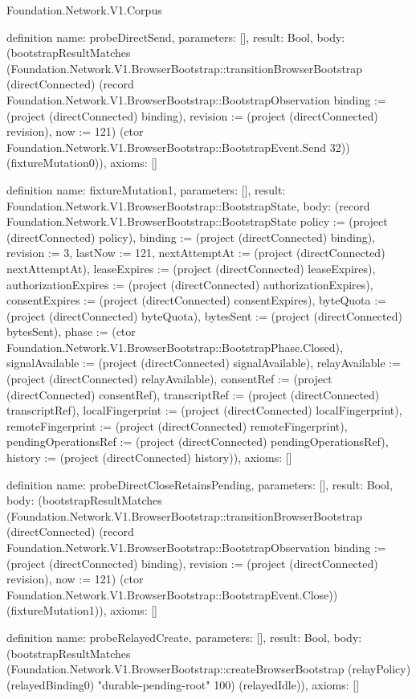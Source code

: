 \begin{lexlean}{Foundation.Network.V1.Corpus}
\begin{semanticmodule}
definition{
  name: probeDirectSend,
  parameters: [],
  result: Bool,
  body: (bootstrapResultMatches (Foundation.Network.V1.BrowserBootstrap::transitionBrowserBootstrap (directConnected) (record Foundation.Network.V1.BrowserBootstrap::BootstrapObservation {binding := (project (directConnected) binding), revision := (project (directConnected) revision), now := 121}) (ctor Foundation.Network.V1.BrowserBootstrap::BootstrapEvent.Send 32)) (fixtureMutation0)),
  axioms: []
}

definition{
  name: fixtureMutation1,
  parameters: [],
  result: Foundation.Network.V1.BrowserBootstrap::BootstrapState,
  body: (record Foundation.Network.V1.BrowserBootstrap::BootstrapState {policy := (project (directConnected) policy), binding := (project (directConnected) binding), revision := 3, lastNow := 121, nextAttemptAt := (project (directConnected) nextAttemptAt), leaseExpires := (project (directConnected) leaseExpires), authorizationExpires := (project (directConnected) authorizationExpires), consentExpires := (project (directConnected) consentExpires), byteQuota := (project (directConnected) byteQuota), bytesSent := (project (directConnected) bytesSent), phase := (ctor Foundation.Network.V1.BrowserBootstrap::BootstrapPhase.Closed), signalAvailable := (project (directConnected) signalAvailable), relayAvailable := (project (directConnected) relayAvailable), consentRef := (project (directConnected) consentRef), transcriptRef := (project (directConnected) transcriptRef), localFingerprint := (project (directConnected) localFingerprint), remoteFingerprint := (project (directConnected) remoteFingerprint), pendingOperationsRef := (project (directConnected) pendingOperationsRef), history := (project (directConnected) history)}),
  axioms: []
}

definition{
  name: probeDirectCloseRetainsPending,
  parameters: [],
  result: Bool,
  body: (bootstrapResultMatches (Foundation.Network.V1.BrowserBootstrap::transitionBrowserBootstrap (directConnected) (record Foundation.Network.V1.BrowserBootstrap::BootstrapObservation {binding := (project (directConnected) binding), revision := (project (directConnected) revision), now := 121}) (ctor Foundation.Network.V1.BrowserBootstrap::BootstrapEvent.Close)) (fixtureMutation1)),
  axioms: []
}

definition{
  name: probeRelayedCreate,
  parameters: [],
  result: Bool,
  body: (bootstrapResultMatches (Foundation.Network.V1.BrowserBootstrap::createBrowserBootstrap (relayPolicy) (relayedBinding0) "durable-pending-root" 100) (relayedIdle)),
  axioms: []
}


\end{semanticmodule}
\end{lexlean}
